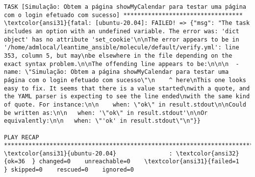 \documentclass{scrartcl}
\begin{document}
\begin{Verbatim}
TASK [Simulação: Obtem a página showMyCalendar para testar uma página com o login efetuado com sucesso] **********************************
\textcolor{ansi31}{fatal: [ubuntu-20.04]: FAILED! => {"msg": "The task includes an option with an undefined variable. The error was: 'dict object' has no attribute 'set_cookie'\n\nThe error appears to be in '/home/admlocal/leantime_ansible/molecule/default/verify.yml': line 353, column 5, but may\nbe elsewhere in the file depending on the exact syntax problem.\n\nThe offending line appears to be:\n\n\n  - name: \"Simulação: Obtem a página showMyCalendar para testar uma página com o login efetuado com sucesso\"\n    ^ here\nThis one looks easy to fix. It seems that there is a value started\nwith a quote, and the YAML parser is expecting to see the line ended\nwith the same kind of quote. For instance:\n\n    when: \"ok\" in result.stdout\n\nCould be written as:\n\n   when: '\"ok\" in result.stdout'\n\nOr equivalently:\n\n   when: \"'ok' in result.stdout\"\n"}}

PLAY RECAP *******************************************************************************************************************************
\textcolor{ansi31}{ubuntu-20.04}               : \textcolor{ansi32}{ok=36  } changed=0    unreachable=0    \textcolor{ansi31}{failed=1   } skipped=0    rescued=0    ignored=0



\end{Verbatim}
\end{document}
